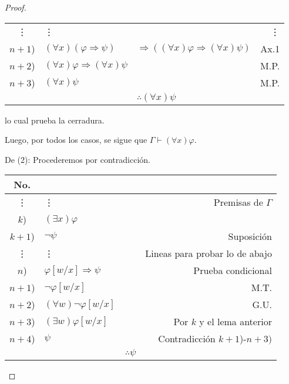 \documentclass[12pt]{report}
\newcounter{it}
\theoremstyle{largebreak}
\begin{document}
\begin{proof}
\begin{itemize}
\begin{center}
\begin{tabular}{ c  l  l  r  }
                    \vdots & \vdots  &  & \vdots  \\
                    $n+1$) & $(\forall x)(\varphi\Rightarrow\psi)$ & $\Rightarrow((\forall x)\varphi\Rightarrow(\forall x)\psi)$  &  Ax.1 \\
                    $n+2$) & $(\forall x)\varphi\Rightarrow(\forall x)\psi$ &  &  M.P. \\
                    $n+3$) & $(\forall x)\psi$ &  &  M.P. \\
                    \hline
                      &  &  $\therefore(\forall x)\psi$ &  \\
                \end{tabular}
            \end{center}
            lo cual prueba la cerradura.
        \end{itemize}
        Luego, por todos los casos, se sigue que $\Gamma\vdash(\forall x)\varphi$.

        De (2): Procederemos por contradicción.
        \begin{center}
            \begin{tabular}{ c  l  l  r  }
                \hline
                No. &  &  &  \\
                \hline
                \vdots & \vdots  &  & Premisas de $\Gamma$  \\
                $k$) & $(\exists x)\varphi$ &  &   \\
                $k+1$) & $\neg\psi$ &  & Suposición \\
                \vdots & \vdots  &  & Lineas para probar lo de abajo  \\
                $n$) & $\varphi[w/x]\Rightarrow\psi$ &  & Prueba condicional \\
                $n+1$) & $\neg\varphi[w/x]$ &  & M.T. \\
                $n+2$) & $(\forall w)\neg\varphi[w/x]$ &  & G.U. \\
                $n+3$) & $(\exists w)\varphi[w/x]$ &  & Por $k$ y el lema anterior \\
                $n+4$) & $\psi$ &  & Contradicción $k+1$)-$n+3)$ \\
                \hline
                  &  &  $\therefore\psi$ &  \\
            \end{tabular}
        \end{center}
    \end{proof}
\end{document}
